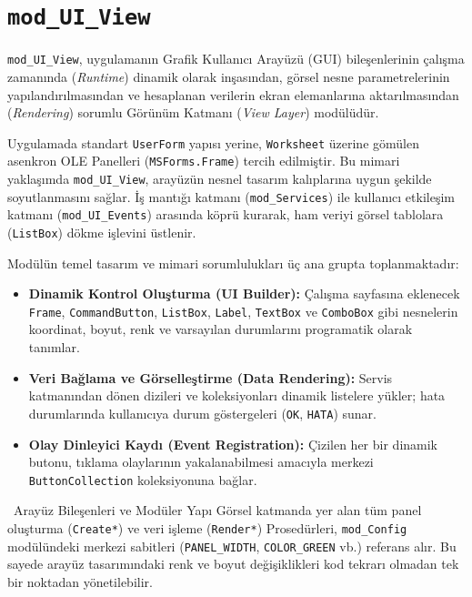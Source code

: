 
\newpage
\section{\texttt{mod\_UI\_View}}

\texttt{mod\_UI\_View}, uygulamanın Grafik Kullanıcı Arayüzü (GUI) bileşenlerinin çalışma zamanında (\textit{Runtime}) dinamik olarak inşasından, görsel nesne parametrelerinin yapılandırılmasından ve hesaplanan verilerin ekran elemanlarına aktarılmasından (\textit{Rendering}) sorumlu Görünüm Katmanı (\textit{View Layer}) modülüdür.

Uygulamada standart \texttt{UserForm} yapısı yerine, \texttt{Worksheet} üzerine gömülen asenkron OLE Panelleri (\texttt{MSForms.Frame}) tercih edilmiştir. Bu mimari yaklaşımda \texttt{mod\_UI\_View}, arayüzün nesnel tasarım kalıplarına uygun şekilde soyutlanmasını sağlar. İş mantığı katmanı (\texttt{mod\_Services}) ile kullanıcı etkileşim katmanı (\texttt{mod\_UI\_Events}) arasında köprü kurarak, ham veriyi görsel tablolara (\texttt{ListBox}) dökme işlevini üstlenir.

Modülün temel tasarım ve mimari sorumlulukları üç ana grupta toplanmaktadır:

\begin{itemize}\setlength{\itemsep}{0pt}\setlength{\parskip}{1pt}
    \item \textbf{Dinamik Kontrol Oluşturma (UI Builder):} Çalışma sayfasına eklenecek \texttt{Frame}, \texttt{CommandButton}, \texttt{ListBox}, \texttt{Label}, \texttt{TextBox} ve \texttt{ComboBox} gibi nesnelerin koordinat, boyut, renk ve varsayılan durumlarını programatik olarak tanımlar.
    \item \textbf{Veri Bağlama ve Görselleştirme (Data Rendering):} Servis katmanından dönen dizileri ve koleksiyonları dinamik listelere yükler; hata durumlarında kullanıcıya durum göstergeleri (\texttt{OK}, \texttt{HATA}) sunar.
    \item \textbf{Olay Dinleyici Kaydı (Event Registration):} Çizilen her bir dinamik butonu, tıklama olaylarının yakalanabilmesi amacıyla merkezi \texttt{ButtonCollection} koleksiyonuna bağlar.
\end{itemize}

\vspace{0.15cm}

\begin{infobox}{\faPalette\ Arayüz Bileşenleri ve Modüler Yapı}
Görsel katmanda yer alan tüm panel oluşturma (\texttt{Create*}) ve veri işleme (\texttt{Render*}) Prosedürleri, \texttt{mod\_Config} modülündeki merkezi sabitleri (\texttt{PANEL\_WIDTH}, \texttt{COLOR\_GREEN} vb.) referans alır. Bu sayede arayüz tasarımındaki renk ve boyut değişiklikleri kod tekrarı olmadan tek bir noktadan yönetilebilir.
\end{infobox}

